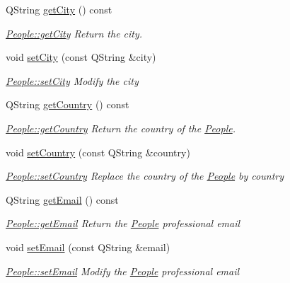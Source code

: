 \begin{DoxyCompactItemize}
Q\-String \hyperlink{classModels_1_1People_a478528b88890758e11887f9d48372680}{get\-City} () const 
\begin{DoxyCompactList}\small\item\em \hyperlink{classModels_1_1People_a478528b88890758e11887f9d48372680}{People\-::get\-City} Return the city. \end{DoxyCompactList}\item 
void \hyperlink{classModels_1_1People_ab19eae39212a096542ed8c24567f3ca9}{set\-City} (const Q\-String \&city)
\begin{DoxyCompactList}\small\item\em \hyperlink{classModels_1_1People_ab19eae39212a096542ed8c24567f3ca9}{People\-::set\-City} Modify the {\itshape city} \end{DoxyCompactList}\item 
Q\-String \hyperlink{classModels_1_1People_a0df66681e0b8fcf099ad0a05863a8e13}{get\-Country} () const 
\begin{DoxyCompactList}\small\item\em \hyperlink{classModels_1_1People_a0df66681e0b8fcf099ad0a05863a8e13}{People\-::get\-Country} Return the country of the \hyperlink{classModels_1_1People}{People}. \end{DoxyCompactList}\item 
void \hyperlink{classModels_1_1People_a3062f5f760ee85553b28b3ef1f15492a}{set\-Country} (const Q\-String \&country)
\begin{DoxyCompactList}\small\item\em \hyperlink{classModels_1_1People_a3062f5f760ee85553b28b3ef1f15492a}{People\-::set\-Country} Replace the country of the \hyperlink{classModels_1_1People}{People} by {\itshape country} \end{DoxyCompactList}\item 
Q\-String \hyperlink{classModels_1_1People_a183e3ac09f44e38b32d7ba72aef85757}{get\-Email} () const 
\begin{DoxyCompactList}\small\item\em \hyperlink{classModels_1_1People_a183e3ac09f44e38b32d7ba72aef85757}{People\-::get\-Email} Return the \hyperlink{classModels_1_1People}{People} professional {\itshape email} \end{DoxyCompactList}\item 
void \hyperlink{classModels_1_1People_a731376949fa1d08e87c7c6ab53f792ab}{set\-Email} (const Q\-String \&email)
\begin{DoxyCompactList}\small\item\em \hyperlink{classModels_1_1People_a731376949fa1d08e87c7c6ab53f792ab}{People\-::set\-Email} Modify the \hyperlink{classModels_1_1People}{People} professional {\itshape email} \end{DoxyCompactList}\item 

\end{DoxyCompactItemize}
